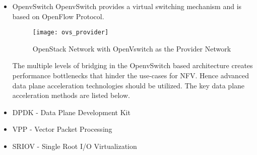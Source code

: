 \begin{enumerate}
\begin{itemize}
        \item OpenvSwitch
            OpenvSwitch provides a virtual switching mechanism and is based on OpenFlow Protocol. 
	
            \begin{figure}
		\centering
                \texttt{[image: ovs\_provider]}
		\label{fig:figure16}
		\caption{OpenStack Network with OpenVswitch as the Provider Network}
	    \end{figure}
				
            The multiple levels of bridging in the OpenvSwitch based architecture creates performance bottlenecks that hinder the use-cases for NFV. Hence advanced data plane acceleration technologies should be utilized. The key data plane acceleration methods are listed below.
	
        \item DPDK - Data Plane Development Kit
	\item VPP - Vector Packet Processing
	\item SRIOV - Single Root I/O Virtualization
    \end{itemize}			
\end{enumerate}
